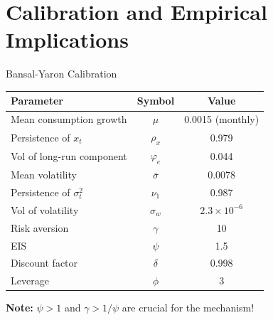 \documentclass{beamer}
\begin{document}
\section{Calibration and Empirical Implications}

\begin{frame}{Bansal-Yaron Calibration}
    \begin{table}[h]
    \centering
    \small
    \begin{tabular}{lcc}
    \toprule
    \textbf{Parameter} & \textbf{Symbol} & \textbf{Value} \\
    \midrule
    Mean consumption growth & $\mu$ & 0.0015 (monthly) \\
    Persistence of $x_t$ & $\rho_x$ & 0.979 \\
    Vol of long-run component & $\varphi_e$ & 0.044 \\
    Mean volatility & $\bar{\sigma}$ & 0.0078 \\
    Persistence of $\sigma_t^2$ & $\nu_1$ & 0.987 \\
    Vol of volatility & $\sigma_w$ & $2.3 \times 10^{-6}$ \\
    \midrule
    Risk aversion & $\gamma$ & 10 \\
    EIS & $\psi$ & 1.5 \\
    Discount factor & $\delta$ & 0.998 \\
    Leverage & $\phi$ & 3 \\
    \bottomrule
    \end{tabular}
    \end{table}
    
    \textbf{Note:} $\psi > 1$ and $\gamma > 1/\psi$ are crucial for the mechanism!
\end{frame}
\end{document}
